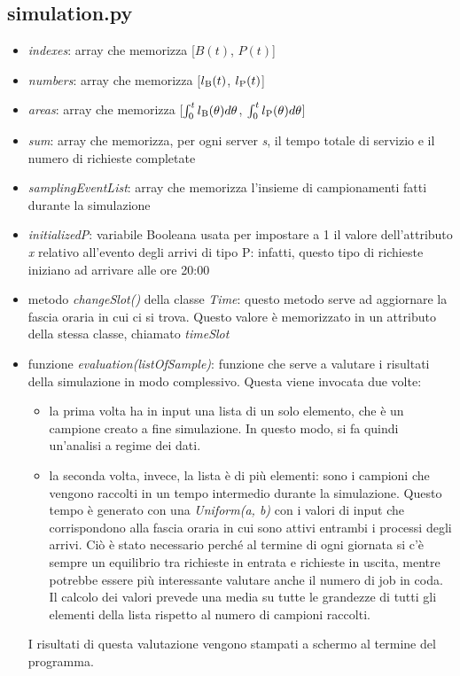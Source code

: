 \documentclass[a4paper, 12pt]{article}
\begin{document}
\subsection{simulation.py}
\begin{itemize}
  \item \emph{indexes}: array che memorizza [$B(t)$, $P(t)$]
  \item \emph{numbers}: array che memorizza [$l\textsubscript{B}(t)$,
$l\textsubscript{P}(t)$]
  \item \emph{areas}: array che memorizza [$\int_{0}^{t}l\textsubscript{B}(\theta)
d\theta$, $\int_{0}^{t}l\textsubscript{P}(\theta)d\theta$]
  \item \emph{sum}: array che memorizza, per ogni server \emph{s}, il tempo totale di
servizio e il numero di richieste completate
  \item \emph{samplingEventList}: array che memorizza l'insieme di campionamenti
fatti durante la simulazione
  \item \emph{initializedP}: variabile Booleana usata per impostare a 1 il valore
dell'attributo \emph{x} relativo all'evento degli arrivi di tipo P: infatti, questo
tipo di richieste iniziano ad arrivare alle ore 20:00
  \item metodo \emph{changeSlot()} della classe \emph{Time}: questo metodo serve ad
aggiornare la fascia oraria in cui ci si trova. Questo valore è memorizzato
in un attributo della stessa classe, chiamato \emph{timeSlot} 
  \item funzione \emph{evaluation(listOfSample)}: funzione che serve a valutare
i risultati della simulazione in modo complessivo. Questa viene invocata due
volte:
    \begin{itemize}
      \item la prima volta ha in input una lista di un solo elemento, che è un
campione creato a fine simulazione. In questo modo, si fa quindi un'analisi
a regime dei dati.
      \item la seconda volta, invece, la lista è di più elementi: sono
i campioni che vengono raccolti in un tempo intermedio durante la simulazione.
Questo tempo è generato con una \emph{Uniform(a, b)} con i valori di input che
corrispondono alla fascia oraria in cui sono attivi entrambi i processi degli
arrivi. Ciò è stato necessario perché al termine di ogni giornata si c'è sempre
un equilibrio tra richieste in entrata e richieste in uscita, mentre potrebbe
essere più interessante valutare anche il numero di job in coda. \newline
Il calcolo dei valori prevede una media su tutte le grandezze di
tutti gli elementi della lista rispetto al numero di campioni raccolti. 
    \end{itemize}
I risultati di questa valutazione vengono stampati a schermo al termine del
programma.


\end{itemize}
\end{document}
